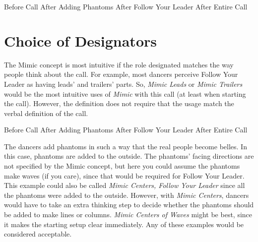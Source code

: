 \documentclass[12pt]{article}
\begin{document}
\displaytwo
{\cr
 }
{Before Call}
{\cr
 }
{After Adding Phantoms}
\displaytwo
{\cr
 }
{After Follow Your Leader}
{}
{After Entire Call}
\endexample

\section{Choice of Designators}

The Mimic concept is most intuitive if the role designated matches
the way people think about the call.  For example, most dancers perceive
Follow Your Leader as having leads' and trailers' parts.
So, \emph{Mimic Leads} or \emph{Mimic Trailers} would be the
most intuitive uses of \emph{Mimic} with this call
(at least when starting the call).
However, the definition does not require that the usage
match the verbal definition of the call.

\displayfour
{\cr
 }
{Before Call}
{\cr
 }
{After Adding Phantoms}
{\cr
 }
 {After Follow Your Leader}
{\cr
 }
{After Entire Call}
\endexample

The dancers add phantoms in such a way that the real people become
belles.  In this case, phantoms are added to the outside.  The phantoms'
facing directions are not specified by the Mimic concept, but here you
could assume the phantoms make waves (if you care),
since that would be required for Follow Your Leader.
This example could also be called
\emph{Mimic Centers, Follow Your Leader} since all the phantoms were
added to the outside.
However, with \emph{Mimic Centers}, dancers would have to take an extra
thinking step to decide whether the phantoms should be added to
make lines or columns.
\emph{Mimic Centers of Waves} might be best, since it makes
the starting setup clear immediately.
Any of these examples would be considered acceptable.
\end{document}
